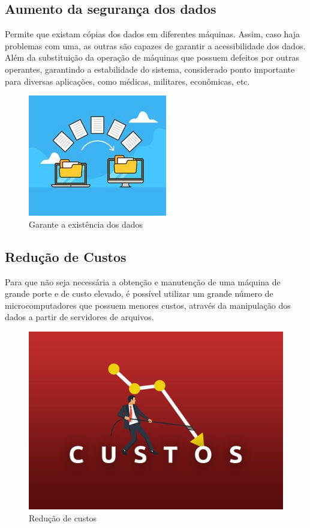 \documentclass[12pt]{article}%
\begin{document}
\subsection{Aumento da segurança dos dados}
\par Permite que existam cópias dos dados em diferentes máquinas. Assim, caso haja problemas com uma, as outras são capazes de garantir a acessibilidade dos dados. Além da substituição da operação de máquinas que possuem defeitos por outras operantes, garantindo a estabilidade do sistema, considerado ponto importante para diversas aplicações, como médicas, militares, econômicas, etc.\citep{youtube}
\begin{figure}[h]
    \centering
    \includegraphics[scale = 0.7]{datasaving.jpg}
    \caption{Garante a existência dos dados\citep{datasaving}}
\end{figure}
\subsection{Redução de Custos}
\par Para que não seja necessária a obtenção e manutenção de uma máquina de grande porte e de custo elevado, é possível utilizar um grande número de microcomputadores que possuem menores custos, através da manipulação dos dados a partir de servidores de arquivos.\citep{youtube}
\begin{figure}[h]
    \centering
    \includegraphics[scale = 0.2]{reduzircustos.jpg}
    \caption{Redução de custos\citep{reduzircustos}}
\end{figure}
\end{document}
